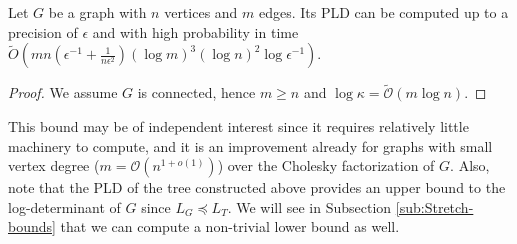 \begin{theorem} \label{thm:PLD-tree}Let $G$ be a graph with $n$
vertices and $m$ edges. Its PLD can be computed up to a precision
of $\epsilon$ and with high probability in time $\tilde{O}\left(mn\left(\epsilon^{-1}+\frac{1}{n\epsilon^{2}}\right)\left(\log m\right)^{3}\left(\log n\right)^{2}\log\epsilon^{-1}\right)$.\end{theorem}

\begin{proof} We assume $G$ is connected, hence $m\geq n$ and $\log\kappa=\tilde{\mathcal{O}}\left(m\log n\right)$.
\end{proof}

This bound may be of independent interest since it requires relatively
little machinery to compute, and it is an improvement already for
graphs with small vertex degree ($m=\mathcal{O}\left(n^{1+o\left(1\right)}\right)$)
over the Cholesky factorization of $G$. Also, note that the PLD of
the tree constructed above provides an upper bound to the log-determinant
of $G$ since $L_{G}\preceq L_{T}$. We will see in Subsection \ref{sub:Stretch-bounds}
that we can compute a non-trivial lower bound as well.
